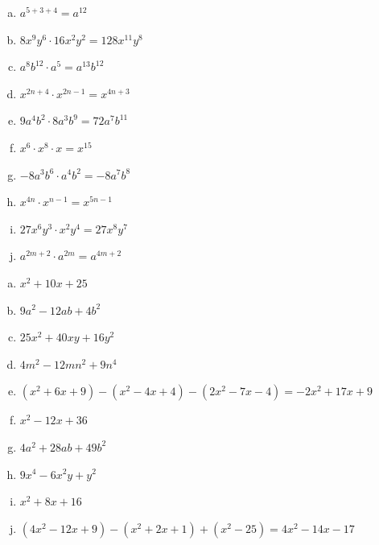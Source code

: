 \documentclass[a4paper,12pt]{letter}
\begin{document}
\begin{resitev}
\begin{enumerate}[a)]
\item $\displaystyle a^{5+3+4}=a^{12}$
\item $\displaystyle 8x^9y^6\cdot16x^2y^2=128x^{11}y^8$
\item $\displaystyle a^8b^{12}\cdot a^5=a^{13}b^{12}$
\item $\displaystyle x^{2n+4}\cdot x^{2n-1}=x^{4n+3}$
\item $\displaystyle 9a^4b^2\cdot8a^3b^9=72a^7b^{11}$
\item $\displaystyle x^6\cdot x^8\cdot x=x^{15}$
\item $\displaystyle -8a^3b^6\cdot a^4b^2=-8a^7b^8$
\item $\displaystyle x^{4n}\cdot x^{n-1}=x^{5n-1}$
\item $\displaystyle 27x^6y^3\cdot x^2y^4=27x^8y^7$
\item $\displaystyle a^{2m+2}\cdot a^{2m}=a^{4m+2}$
\end{enumerate}
\end{resitev}

\begin{resitev}
\begin{enumerate}[a)]
\item $\displaystyle x^2+10x+25$
\item $\displaystyle 9a^2-12ab+4b^2$
\item $\displaystyle 25x^2+40xy+16y^2$
\item $\displaystyle 4m^2-12mn^2+9n^4$
\item $\displaystyle (x^2+6x+9)-(x^2-4x+4)-(2x^2-7x-4)=-2x^2+17x+9$
\item $\displaystyle x^2-12x+36$
\item $\displaystyle 4a^2+28ab+49b^2$
\item $\displaystyle 9x^4-6x^2y+y^2$
\item $\displaystyle x^2+8x+16$
\item $\displaystyle (4x^2-12x+9)-(x^2+2x+1)+(x^2-25)=4x^2-14x-17$
\end{enumerate}
\end{resitev}
\end{document}
